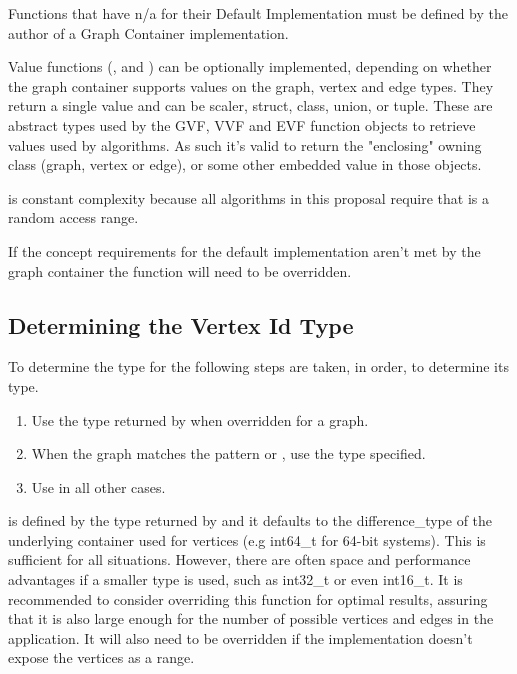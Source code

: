 Functions that have n/a for their Default Implementation must be defined by the author of a Graph Container implementation. 

Value functions (,  and ) can be optionally implemented, 
depending on whether the graph container supports values on the graph, vertex and edge types. They return a single value and can 
be scaler, struct, class, union, or tuple. These are abstract types used by the GVF, VVF and EVF function objects to retrieve
values used by algorithms. As such it's valid to return the "enclosing" owning class (graph, vertex or edge), or some other
embedded value in those objects.

 is constant complexity because all algorithms in this proposal require that  is a random access range. 

If the concept requirements for the default implementation aren't met by the graph container the function will need to be overridden.

\subsection{Determining the Vertex Id Type}
To determine the type for  the following steps are taken, in order, to determine its type.
\begin{enumerate}
    \item Use the type returned by  when overridden for a graph.
    \item When the graph matches the pattern  or ,
          use the  type specified.
    \item Use  in all other cases.
\end{enumerate}

 is defined by the type returned by  and it defaults to the difference\_type of the underlying container used for vertices (e.g int64\_t for 64-bit systems). 
This is sufficient for all situations. However, there are often space and performance advantages if a smaller type is used, such as int32\_t or even int16\_t. It is recommended to consider overriding 
this function for optimal results, assuring that it is also large enough for the number of possible vertices and edges in the application. It will also need to be overridden if the implementation doesn't 
expose the vertices as a range.

